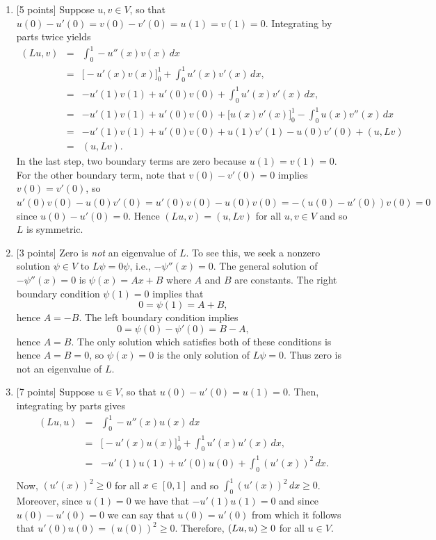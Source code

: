 \begin{solution}
\begin{enumerate}
\item {[5 points]} Suppose $u,v \in V$, so that $u(0)-u'(0)=v(0)-v'(0)=u(1)=v(1)=0.$
      Integrating by parts twice yields
\begin{eqnarray*}
 (Lu,v) &=& \int_0^1 -u''(x)v(x) \,dx \\[0.5em]
        &=& \Big[ -u'(x)v(x)\Big]_0^1 + \int_0^1 u'(x)v'(x)\,dx, \\[.5em]
        &=& -u'(1)v(1)+u'(0)v(0) + \int_0^1 u'(x)v'(x)\,dx,\\[.5em]
        &=& -u'(1)v(1)+u'(0)v(0) + \Big[ u(x)v'(x)\Big]_0^1 - \int_0^1 u(x)v''(x)\,dx\\[.5em]
        &=& -u'(1)v(1)+u'(0)v(0) + u(1)v'(1)-u(0)v'(0) + (u,Lv)\\[.5em]
        &=& (u,Lv).
\end{eqnarray*}
In the last step, two boundary terms are zero because $u(1)=v(1)=0$.
For the other boundary term, note that $v(0)-v'(0)=0$ implies $v(0)=v'(0)$,
so $u'(0)v(0) - u(0)v'(0) = u'(0)v(0) - u(0)v(0) = -(u(0)-u'(0))v(0) = 0$
since $u(0)-u'(0)=0$.  Hence $(Lu,v) = (u,Lv)$ for all $u,v \in V$ and so $L$ is symmetric.

\item {[3 points]} Zero is \emph{not} an eigenvalue of $L$.  To see this, 
      we seek a nonzero solution $\psi\in V$ to $L\psi = 0 \psi$, i.e., $-\psi''(x) = 0$.
      The general solution of $-\psi''(x) = 0$ is $\psi(x) = A x + B$ where $A$ and $B$ are constants.
      The right boundary condition $\psi(1)=0$ implies that 
       \[ 0 = \psi(1) = A + B,\]
      hence $A = -B$.  The left boundary condition implies
       \[ 0 = \psi(0) - \psi'(0) = B - A,\]
      hence $A=B$.  The only solution which satisfies both of these conditions is hence
      $A=B=0$, so $\psi(x) = 0$ is the only solution 
      of $L\psi = 0$.
      Thus zero is not an eigenvalue of $L$.

\item {[7 points]} Suppose $u\in V$, so that $u(0)-u'(0)=u(1)=0.$ Then, integrating by parts gives
\begin{eqnarray*}
 (Lu,u) &=& \int_0^1 -u''(x)u(x) \,dx \\[0.5em]
        &=& \Big[ -u'(x)u(x)\Big]_0^1 + \int_0^1  u'(x)u'(x)\,dx, \\[.5em]
        &=& -u'(1)u(1)+u'(0)u(0) + \int_0^1 (u'(x))^2\,dx.\\[.5em]
\end{eqnarray*}
Now, $(u'(x))^2\ge0$ for all $x\in[0,1]$ and so $\int_0^1 (u'(x))^2\,dx\ge0$. Moreover, since  $u(1)=0$ we have that $-u'(1)u(1)=0$ and since $u(0)-u'(0)=0$ we can say that $u(0)=u'(0)$ from which it follows that $u'(0)u(0)=(u(0))^2\ge0$. Therefore, $(Lu,u)\ge0$ for all $u\in V$.


\end{enumerate}
\end{solution}
